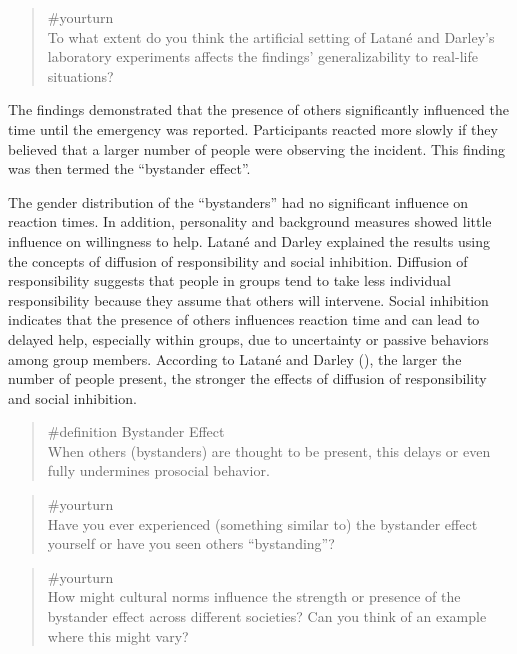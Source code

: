 \documentclass[
  letterpaper,
]{book}
\begin{document}
\begin{quote}
{\#yourturn}\\
To what extent do you think the artificial setting of Latané and
Darley's laboratory experiments affects the findings' generalizability
to real-life situations?
\end{quote}

The findings demonstrated that the presence of others significantly
influenced the time until the emergency was reported. Participants
reacted more slowly if they believed that a larger number of people were
observing the incident. This finding was then termed the ``bystander
effect''.

The gender distribution of the ``bystanders'' had no significant
influence on reaction times. In addition, personality and background
measures showed little influence on willingness to help. Latané and
Darley explained the results using the concepts of diffusion of
responsibility and social inhibition. Diffusion of responsibility
suggests that people in groups tend to take less individual
responsibility because they assume that others will intervene. Social
inhibition indicates that the presence of others influences reaction
time and can lead to delayed help, especially within groups, due to
uncertainty or passive behaviors among group members. According to
Latané and Darley (), the
larger the number of people present, the stronger the effects of
diffusion of responsibility and social inhibition.

\begin{quote}
\label{def-bystandereffect}{\#definition} Bystander
Effect\\
When others (bystanders) are thought to be present, this delays or even
fully undermines prosocial behavior.
\end{quote}

\begin{quote}
{\#yourturn}\\
Have you ever experienced (something similar to) the bystander effect
yourself or have you seen others ``bystanding''?
\end{quote}

\begin{quote}
{\#yourturn}\\
How might cultural norms influence the strength or presence of the
bystander effect across different societies? Can you think of an example
where this might vary?
\end{quote}
\end{document}
